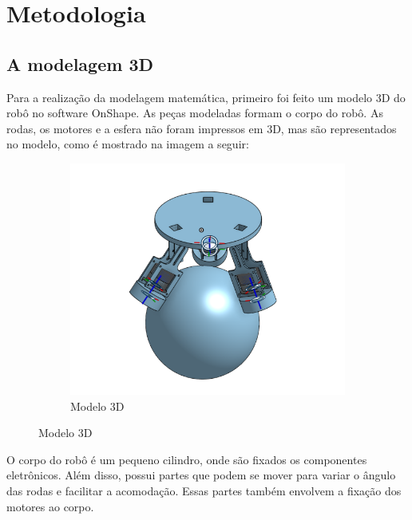 \chapter{Metodologia}
\label{chap:metodologia}

\section{A modelagem 3D}
\label{sec:modelagem3d}

Para a realização da modelagem matemática, primeiro foi feito um modelo 3D do robô no software OnShape. As peças modeladas formam o corpo do robô. As rodas, os motores e a esfera não foram impressos em 3D, mas são representados no modelo, como é mostrado na imagem a seguir:

\begin{figure}[H]
    \centering
    \begin{subfigure}[b]{1.0\textwidth}
        \centering
        \includegraphics[width=\linewidth]{Metodologia/Figuras/ballbot.png}
        \caption{Modelo 3D}
        \label{fig:modelo_3D}
    \end{subfigure}
\end{figure}

O corpo do robô é um pequeno cilindro, onde são fixados os componentes eletrônicos. Além disso, possui partes que podem se mover para variar o ângulo das rodas e facilitar a acomodação. Essas partes também envolvem a fixação dos motores ao corpo.

